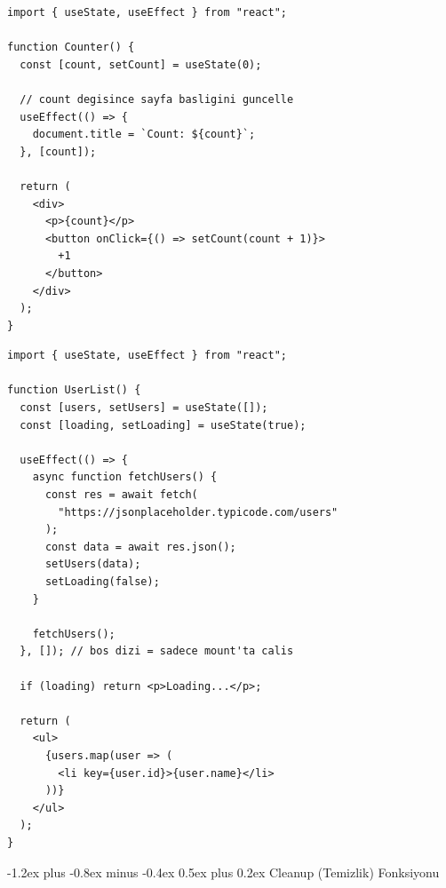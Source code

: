 \documentclass[12pt, a4paper]{article}
\makeatletter
\renewcommand{\subsection}{%
  \@startsection{subsection}{2}{\z@}%
    {-1.2ex plus -0.8ex minus -0.4ex}%
    {0.5ex plus 0.2ex}%
    {\normalfont\large\bfseries\sffamily\color{secondary}}%
}
\makeatother
\begin{document}
\begin{tcolorbox}[enhanced, colback=codebg, colframe=gray!30,
    colbacktitle=primary!85!black, coltitle=white, arc=4pt,
    title={\sffamily\bfseries\small Örnek 1 --- Sayfa Başlığını Güncelleme}]
\begin{lstlisting}[style=jsxstyle]
import { useState, useEffect } from "react";

function Counter() {
  const [count, setCount] = useState(0);

  // count degisince sayfa basligini guncelle
  useEffect(() => {
    document.title = `Count: ${count}`;
  }, [count]);

  return (
    <div>
      <p>{count}</p>
      <button onClick={() => setCount(count + 1)}>
        +1
      </button>
    </div>
  );
}
\end{lstlisting}
\end{tcolorbox}

\vspace{6pt}

\begin{tcolorbox}[enhanced, colback=codebg, colframe=gray!30,
    colbacktitle=primary!85!black, coltitle=white, arc=4pt,
    title={\sffamily\bfseries\small Örnek 2 --- API'den Veri Çekme (En Yaygın Kullanım)}]
\begin{lstlisting}[style=jsxstyle]
import { useState, useEffect } from "react";

function UserList() {
  const [users, setUsers] = useState([]);
  const [loading, setLoading] = useState(true);

  useEffect(() => {
    async function fetchUsers() {
      const res = await fetch(
        "https://jsonplaceholder.typicode.com/users"
      );
      const data = await res.json();
      setUsers(data);
      setLoading(false);
    }

    fetchUsers();
  }, []); // bos dizi = sadece mount'ta calis

  if (loading) return <p>Loading...</p>;

  return (
    <ul>
      {users.map(user => (
        <li key={user.id}>{user.name}</li>
      ))}
    </ul>
  );
}
\end{lstlisting}
\end{tcolorbox}

\newpage
\subsection{Cleanup (Temizlik) Fonksiyonu}
\end{document}
